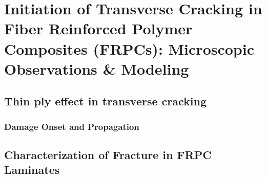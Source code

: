 \documentclass[first,firstsupp,lastsupp,last,hyperref,table]{ETHclass}
\begin{document}
\section[Transverse Cracking in FRPCs]{Initiation of Transverse Cracking in Fiber Reinforced Polymer Composites (FRPCs): Microscopic Observations \& Modeling}

\subsection{Thin ply effect in transverse cracking}

\begin{frame}
\frametitle{\small Damage Onset and Propagation}
\vspace{-0.75cm}
\centering
\captionsetup[subfigure]{labelfont=footnotesize}
\end{frame}


\subsection[Characterization of Fracture in FRPC]{Characterization of Fracture in FRPC Laminates}
\end{document}
